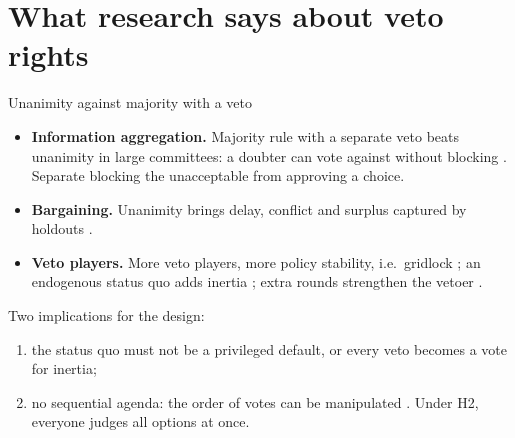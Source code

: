 \documentclass[10pt,aspectratio=169]{beamer}
\begin{document}
\section{What research says about veto rights}

\begin{frame}{Unanimity against majority with a veto}
  \begin{itemize}
    \item \textbf{Information aggregation.} Majority rule with a separate veto beats unanimity in large
      committees: a doubter can vote against without blocking .
      \alert{Separate blocking the unacceptable from approving a choice.}
    \item \textbf{Bargaining.} Unanimity brings delay, conflict and surplus captured by holdouts
      .
    \item \textbf{Veto players.} More veto players, more policy stability, i.e.\ gridlock
      ; an endogenous status quo adds inertia ; extra
      rounds strengthen the vetoer .
  \end{itemize}
  \medskip
  Two implications for the design:
  \begin{enumerate}
    \item the status quo must not be a privileged default, or every veto becomes a vote for inertia;
    \item no sequential agenda: the order of votes can be manipulated . Under H2, everyone judges all options at once.
  \end{enumerate}
\end{frame}
\end{document}

